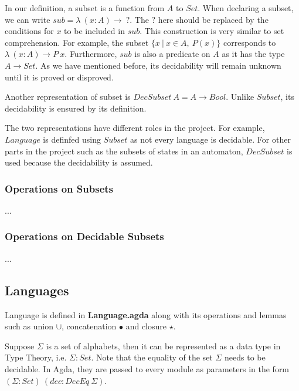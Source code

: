 \par In our definition, a subset is a function from \(A\) to
\(Set\). When declaring a subset, we can write \(sub =
\lambda\ (x : A) \to\ ?\). The \(?\) here should be replaced by the
conditions for \(x\) to be included in \(sub\). This construction is
very similar to set comprehension. For example, the subset 
\(\{x\ | \ x \in A,\ P(x)\}\) corresponds to \(\lambda\ (x : A) \to P\
x\). Furthermore, \(sub\) is also a predicate on \(A\) as it has the
type \(A \to Set\). As we have mentioned before, its decidability will
remain unknown until it is proved or disproved. 

\begin{defn} 
\noindent Another representation of subset is \(DecSubset\ A = A \to
Bool\). Unlike \(Subset\), its decidability is ensured by its
definition. 
\end{defn}

\par The two representations have different roles in the project. For
example, \(Language\) is definfed using \(Subset\) as not every
language is decidable. For other parts in the project 
such as the subsets of states in an automaton, \(DecSubset\) is used
because the decidability is assumed. 

\subsubsection{Operations on Subsets}
\par ...

\subsubsection{Operations on Decidable Subsets}
\par ...


\subsection{Languages}
\par Language is defined in \textbf{Language.agda} along with its 
operations and lemmas such as union \(\cup\), concatenation
\(\bullet\) and closure \(\star\). 

\par Suppose \(\Sigma\) is a set of alphabets, then it
can be represented as a data type in Type Theory, i.e. \(\Sigma :
Set\). Note that the equality of the set \(\Sigma\) needs to be
decidable. In Agda, they are passed to every module as
parameters in the form \((\Sigma : Set)\ (dec : DecEq\ \Sigma)\). 

